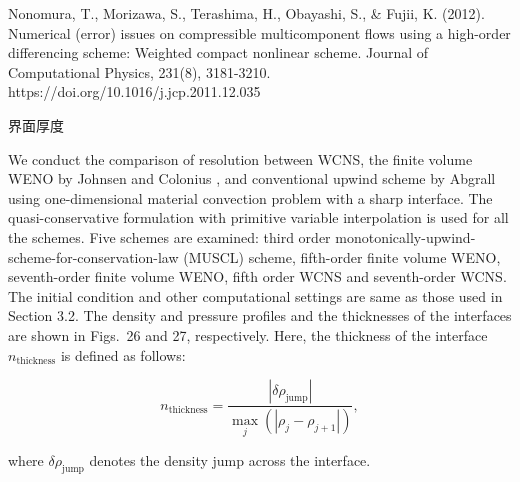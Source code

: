 \documentclass{book}
\begin{document}
Nonomura, T., Morizawa, S., Terashima, H., Obayashi, S., \& Fujii, K. (2012). Numerical (error) issues on compressible multicomponent flows using a high-order differencing scheme: Weighted compact nonlinear scheme. Journal of Computational Physics, 231(8), 3181-3210. https://doi.org/10.1016/j.jcp.2011.12.035 

界面厚度

We conduct the comparison of resolution between WCNS, the finite volume WENO by Johnsen and Colonius \cite{22}, and conventional upwind scheme by Abgrall \cite{20} using one-dimensional material convection problem with a sharp interface. The quasi-conservative formulation with primitive variable interpolation is used for all the schemes. Five schemes are examined: third order monotonically-upwind-scheme-for-conservation-law (MUSCL) scheme, fifth-order finite volume WENO, seventh-order finite volume WENO, fifth order WCNS and seventh-order WCNS. The initial condition and other computational settings are same as those used in Section 3.2. The density and pressure profiles and the thicknesses of the interfaces are shown in Figs.~26 and 27, respectively. Here, the thickness of the interface \( n_{\text{thickness}} \) is defined as follows:

\[
n_{\text{thickness}} = \frac{|\delta \rho_{\text{jump}}|}{\max_j (|\rho_j - \rho_{j+1}|)},
\]

where \(\delta \rho_{\text{jump}}\) denotes the density jump across the interface.



\end{document}
